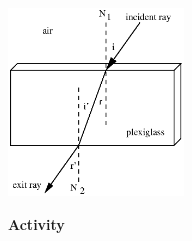 {\centering \includegraphics[width=0.35\textwidth]{refraction_of_light/refraction_of_light_fig_1.eps} \par}


\pagebreak[2]
\textbf{Activity} 

